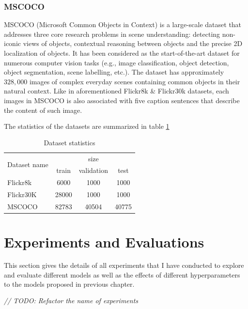 \subsubsection{MSCOCO}
\label{sec:dataset_mscoco}

MSCOCO \cite{DBLP:journals/corr/LinMBHPRDZ14} (Microsoft Common Objects in Context) is a large-scale dataset that addresses three core research problems in scene understanding: detecting non-iconic views of objects, contextual reasoning between objects and the precise 2D localization of objects. It has been considered as the start-of-the-art dataset for numerous computer vision tasks (e.g., image classification, object detection, object segmentation, scene labelling, etc.). The dataset has approximately $328,000$ images of complex everyday scenes containing common objects in their natural context. Like in aforementioned Flickr8k \& Flickr30k datasets, each images in MSCOCO is also associated with five caption sentences that describe the content of such image.

The statistics of the datasets are summarized in table \ref{tab:dataset-statistics}
\begin{table}
	\centering
	\label{tab:dataset-statistics}
	\begin{tabular}{lccc}
		\toprule
		\multirow{2}{*}{Dataset name} & \multicolumn{3}{c}{size} \\ \cline{2-4}
		& train & validation & test \\ \midrule
		Flickr8k & 6000 & 1000 & 1000 \\
		Flickr30K & 28000 & 1000 & 1000 \\
		MSCOCO & 82783 & 40504 & 40775 \\
		\bottomrule
	\end{tabular}
	\caption{Dataset statistics}
\end{table}


\section{Experiments and Evaluations}
\label{sec:chap4_experiment}

This section gives the details of all experiments that I have conducted to explore and evaluate different models as well as the effects of different hyperparameters to the models proposed in previous chapter. 

\textit{// TODO: Refactor the name of experiments}

